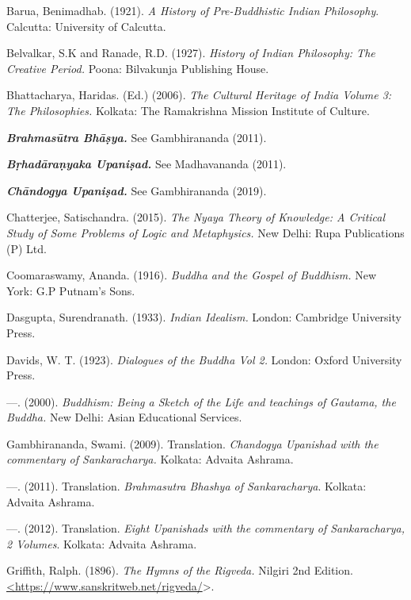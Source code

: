 \begin{thebibliography}{99}
\itemsep=1pt
 Barua, Benimadhab. (1921).\textit{ A History of Pre-Buddhistic Indian Philosophy}. Calcutta: University of Calcutta.

  Belvalkar, S.K and Ranade, R.D. (1927). \textit{History of Indian Philosophy: The Creative Period.} Poona: Bilvakunja Publishing House.

  Bhattacharya, Haridas. (Ed.) (2006). \textit{The Cultural Heritage of India Volume 3: The Philosophies.} Kolkata: The Ramakrishna Mission Institute of Culture.
 
  \textbf{\textit{Brahmasūtra Bhāṣya.}} See Gambhirananda (2011).
 
  \textbf{\textit{Bṛhadāraṇyaka Upaniṣad.}} See Madhavananda (2011).
 
  \textbf{\textit{Chāndogya Upaniṣad.}} See Gambhirananda (2019).

  Chatterjee, Satischandra. (2015). \textit{The Nyaya Theory of Knowledge: A Critical Study of Some Problems of Logic and Metaphysics.} New Delhi: Rupa Publications (P) Ltd.

  Coomaraswamy, Ananda. (1916). \textit{Buddha and the Gospel of Buddhism.} New York: G.P Putnam’s Sons.

  Dasgupta, Surendranath. (1933).\textit{ Indian Idealism.} London: Cambridge University Press.

  Davids, W. T. (1923). \textit{Dialogues of the Buddha Vol 2.} London: Oxford University Press.

  —. (2000). \textit{Buddhism: Being a Sketch of the Life and teachings of Gautama, the Buddha.} New Delhi: Asian Educational Services.

  Gambhirananda, Swami. (2009). Translation. \textit{Chandogya Upanishad with the commentary of Sankaracharya.} Kolkata: Advaita Ashrama.

  —. (2011). Translation. \textit{Brahmasutra Bhashya of Sankaracharya}. Kolkata: Advaita Ashrama.

  —. (2012). Translation. \textit{Eight Upanishads with the commentary of Sankaracharya, 2 Volumes}. Kolkata: Advaita Ashrama.

  Griffith, Ralph. (1896). \textit{The Hymns of the Rigveda.} Nilgiri 2nd Edition. \url{<https://www.sanskritweb.net/rigveda/}\textgreater .


\end{thebibliography}
